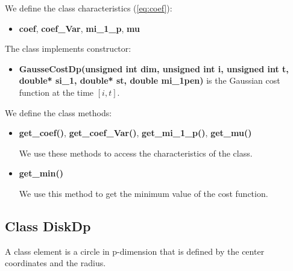 \documentclass{report}
\begin{document}
	We define the class characteristics (\ref{eq:coef}): 
	
	\begin{itemize}
		\item {\bfseries coef}, {\bfseries coef\_Var}, {\bfseries mi\_1\_p}, {\bfseries mu}
	\end{itemize}
 
	The class implements constructor:
	\begin{itemize}
		
		\item {\bfseries GausseCostDp(unsigned int dim, unsigned int i, unsigned int t, double* si\_1, double* st, double mi\_1pen)} is the Gaussian cost function at the time $[i,t]$. 
	\end{itemize}
	
	We define the class methods:
	
	\begin{itemize}
		\item {\bfseries get\_coef()}, {\bfseries get\_coef\_Var()}, {\bfseries get\_mi\_1\_p()}, {\bfseries get\_mu()}
		
		We use these  methods to access the characteristics of the class. 
		
		\item {\bfseries get\_min()}
		
		We use this method to get the minimum value of the cost function.
	\end{itemize} 


	\subsection*{Class DiskDp}
	\label{DiskDp}
	
	A class element is a circle in p-dimension that is defined by the center coordinates and the radius.
	
\end{document}
